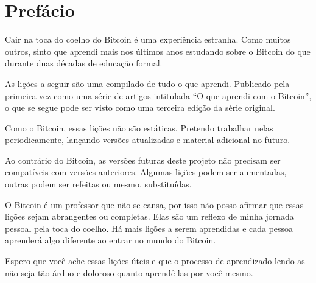 \chapter*{Prefácio}

Cair na toca do coelho do Bitcoin é uma experiência estranha. Como muitos outros, sinto que aprendi mais nos últimos anos estudando sobre o Bitcoin do que durante duas décadas de educação formal.

As lições a seguir são uma compilado de tudo o que aprendi. Publicado pela primeira vez como uma série de artigos intitulada {“O que aprendi com o Bitcoin”}, o que se segue pode ser visto como uma terceira edição da série original.

Como o Bitcoin, essas lições não são estáticas. Pretendo trabalhar nelas periodicamente, lançando versões atualizadas e material adicional no futuro.

Ao contrário do Bitcoin, as versões futuras deste projeto não precisam ser compatíveis com versões anteriores. Algumas lições podem ser aumentadas, outras podem ser refeitas ou mesmo, substituídas.

O Bitcoin é um professor que não se cansa, por isso não posso afirmar que essas lições sejam abrangentes ou completas. Elas são um reflexo de minha jornada pessoal pela toca do coelho. Há mais lições a serem aprendidas e cada pessoa aprenderá algo diferente ao entrar no mundo do Bitcoin.

Espero que você ache essas lições úteis e que o processo de aprendizado lendo-as não seja tão árduo e doloroso quanto aprendê-las por você mesmo.

%
%
